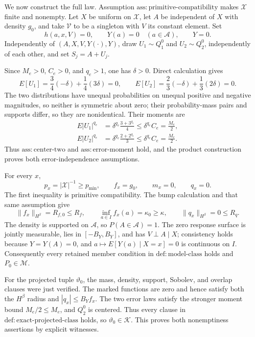 We now construct the full law.  Assumption \(\mathrm{ass{:}primitive\text{-}compatibility}\) makes \(\mathcal X\) finite and nonempty.  Let \(X\) be uniform on \(\mathcal X\), let \(A\) be independent of \(X\) with density \(g_0\), and take \(\mathcal V\) to be a singleton with \(V\) its constant element.  Set
\[
 h(a,x,V)=0,
 \qquad Y(a)=0\quad(a\in\mathcal A),
 \qquad Y=0.
\]
Independently of \((A,X,V,Y(\cdot),Y)\), draw \(U_1\sim Q_1^0\) and \(U_2\sim Q_2^0\), independently of each other, and set \(S_j=A+U_j\).

Since \(M_e>0\), \(C_e>0\), and \(q_e>1\), one has \(\delta>0\).  Direct calculation gives
\[
 E[U_1]=\frac34(-\delta)+\frac14(3\delta)=0,
 \qquad
 E[U_2]=\frac23(-\delta)+\frac13(2\delta)=0.
\]
The two distributions have unequal probabilities on unequal positive and negative magnitudes, so neither is symmetric about zero; their probability-mass pairs and supports differ, so they are nonidentical.  Their moments are
\[
 \begin{aligned}
 E|U_1|^{q_e}
 &=\delta^{q_e}\frac{3+3^{q_e}}4
 \le \delta^{q_e}C_e=\frac{M_e}{2},\\
 E|U_2|^{q_e}
 &=\delta^{q_e}\frac{2+2^{q_e}}3
 \le \delta^{q_e}C_e=\frac{M_e}{2}.
 \end{aligned}
\]
Thus \(\mathrm{ass{:}center\text{-}two}\) and \(\mathrm{ass{:}error\text{-}moment}\) hold, and the product construction proves both error-independence assumptions.

For every \(x\),
\[
 p_x=|\mathcal X|^{-1}\ge p_{\min},
 \qquad f_x=g_0,
 \qquad m_x=0,
 \qquad q_x=0.
\]
The first inequality is primitive compatibility.  The bump calculation and that same assumption give
\[
 \|f_x\|_{H^\beta}=R_{f,0}\le R_f,
 \qquad
 \inf_{a\in I}f_x(a)=\kappa_0\ge\kappa,
 \qquad
 \|q_x\|_{H^\beta}=0\le R_q.
\]
The density is supported on \(\mathcal A\), so \(P(A\in\mathcal A)=1\).  The zero response surface is jointly measurable, lies in \([-B_Y,B_Y]\), and has \(V\perp A\mid X\); consistency holds because \(Y=Y(A)=0\), and \(a\mapsto E[Y(a)\mid X=x]=0\) is continuous on \(I\).  Consequently every retained member condition in \(\mathrm{def{:}model\text{-}class}\) holds and \(P_0\in\mathcal M\).

For the projected tuple \(\vartheta_0\), the mass, density, support, Sobolev, and overlap clauses were just verified.  The marked functions are zero and hence satisfy both the \(H^\beta\) radius and \(|q_x|\le B_Yf_x\).  The two error laws satisfy the stronger moment bound \(M_e/2\le M_e\), and \(Q_2^0\) is centered.  Thus every clause in \(\mathrm{def{:}exact\text{-}projected\text{-}class}\) holds, so \(\vartheta_0\in\mathscr K\).  This proves both nonemptiness assertions by explicit witnesses.

